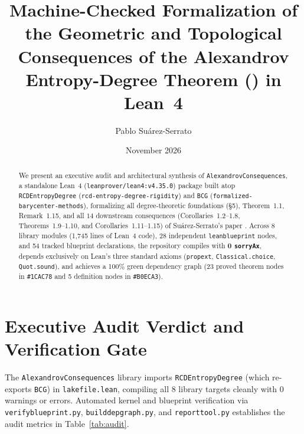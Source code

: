 \documentclass[10pt]{article}
\title{\vspace{-2.0em}\textbf{Machine-Checked Formalization of the Geometric and Topological Consequences of the Alexandrov Entropy-Degree Theorem (\code{arXiv:2606.30403}) in Lean~4}}
\author{Pablo Su\'arez-Serrato}
\date{November 2026\vspace{-1.2em}}
\renewcommand{\_}{\origus\allowbreak}
\newcommand{\code}[1]{\texttt{#1}}
\newcommand{\LeanToolchain}{leanprover/lean4:v4.35.0}
\newcommand{\NModules}{8}
\newcommand{\NLines}{1{,}745}
\newcommand{\NTotalNodes}{28}
\newcommand{\NProvedNodes}{23}
\newcommand{\NDefNodes}{5}
\newcommand{\NLeanDecls}{54}
\newcommand{\NSorryAx}{0}
\begin{document}
\maketitle

\begin{abstract}
\noindent
We present an executive audit and architectural synthesis of \code{AlexandrovConsequences}, a
standalone Lean~4 (\code{\LeanToolchain}) package built atop \code{RCDEntropyDegree}
(\code{rcd-entropy-degree-rigidity}) and \code{BCG} (\code{formalized-barycenter-methods}),
formalizing all degree-theoretic foundations (\S5),
Theorem~1.1, Remark~1.15, and all $14$ downstream consequences (Corollaries~1.2--1.8, Theorems~1.9--1.10,
and Corollaries~1.11--1.15) of Su\'arez-Serrato's paper \cite{SuarezSerrato2026Alex}. Across
\NModules{} library modules (\NLines{} lines of Lean~4 code), \NTotalNodes{} independent
\code{leanblueprint} nodes, and \NLeanDecls{} tracked blueprint declarations, the repository
compiles with \textbf{\NSorryAx{} \code{sorryAx}}, depends exclusively on Lean's three standard
axioms (\code{propext}, \code{Classical.choice}, \code{Quot.sound}), and achieves a 100\% green
dependency graph (\NProvedNodes{} proved theorem nodes in \code{\#1CAC78} and \NDefNodes{}
definition nodes in \code{\#B0ECA3}).
\end{abstract}

\section{Executive Audit Verdict and Verification Gate}

The \code{AlexandrovConsequences} library imports \code{RCDEntropyDegree} (which re-exports \code{BCG}) in
\code{lakefile.lean}, compiling all \NModules{} library targets cleanly with $0$ warnings or errors.
Automated kernel and blueprint verification via
\code{verify\_blueprint.py}, \code{build\_dep\_graph.py}, and \code{report\_tool.py} establishes
the audit metrics in Table~\ref{tab:audit}.
\end{document}
